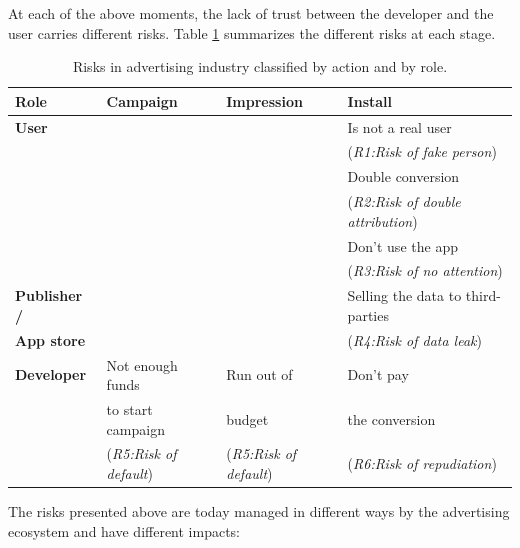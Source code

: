 
At each of the above moments, the lack of trust between the developer and the user carries different risks. Table \ref{tab:risks} summarizes the different risks at each stage.


\begin{table}[ht]
\centering
\begin{tabular}{|l||l|l|l|} \hline
{\bf Role} & {\bf Campaign} & {\bf Impression}  & {\bf Install} \\ \hline
{\bf User} & & & Is not a real user \\ 
 & & & ({\em R1:Risk of fake person}) \\ 
 & & & Double conversion  \\
 & & & ({\em R2:Risk of double attribution}) \\
 & & & Don't use the app  \\
 & & & ({\em R3:Risk of no attention}) \\  \hline
{\bf Publisher  /}  & & & Selling the data to third-parties \\ 
{\bf App store} & & & ({\em R4:Risk of data leak})\\ \hline
{\bf Developer} & Not enough funds & Run out of & Don't pay \\  
 & to start campaign & budget & the conversion \\  
  & ({\em R5:Risk of default}) & ({\em R5:Risk of default}) & ({\em R6:Risk of repudiation}) \\  
\hline\end{tabular}
\caption{Risks in advertising industry classified by action and by role.}
\label{tab:risks}
\end{table}

The risks presented above are today managed in different ways by the advertising ecosystem and have different impacts:

